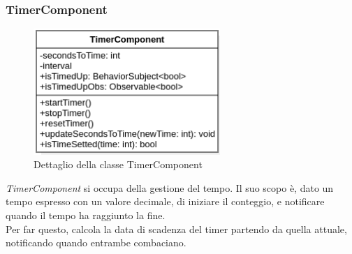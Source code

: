 \subsubsection{TimerComponent}
\begin{figure}[h]
    \centering
    \includegraphics[width=200pt]{ProgettazioneTecnica/TimerComponent.png}
    \caption{Dettaglio della classe TimerComponent}
    \label{fig:timer}
\end{figure}
\emph{TimerComponent} si occupa della gestione del tempo. Il suo scopo è, dato un tempo espresso con un valore decimale, di iniziare il conteggio, e notificare quando il tempo ha raggiunto la fine.\\
Per far questo, calcola la data di scadenza del timer partendo da quella attuale, notificando quando entrambe combaciano.
